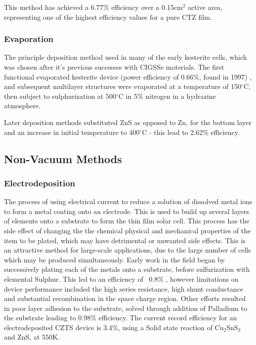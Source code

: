 This method has achieved a 6.77\% efficiency over a 0.15cm$^2$ active area, representing one of the highest efficiency values for a pure CTZ film. \citep{Mitzi2011}
\subsubsection{Evaporation}

The principle deposition method used in many of the early kesterite cells, which was chosen after it's previous successes with CIGSSe materials.
The first functional evaporated kesterite device (power efficiency of 0.66\%, found in 1997) , and subsequent multilayer structures were evaporated at a temperature of 150$^\circ$C, then subject to sulphurization at 500$^\circ$C in 5\% nitrogen in a hydrazine atmosphere.

Later deposition methods substituted ZnS as opposed to Zn, for the bottom layer and an increase in initial temperature to 400$^\circ$C - this lead to 2.62\% efficiency.\citep{Todorov2010}
\subsection{Non-Vacuum Methods}
\subsubsection{Electrodeposition}
The process of using electrical current to reduce a solution of dissolved metal ions to form a metal coating onto an electrode. This is used to build up several layers of elements onto a substrate to form the thin film solar cell. This process has the side effect of changing the the chemical physical and mechanical properties of the item to be plated, which may have detrimental or unwanted side effects. This is an attractive method for large-scale applications, due to the large number of cells which may be produced simultaneously. Early work in the field began by successively plating each of the metals onto a substrate, before sulfurization with elemental Sulphur. This led to an efficiency of ~0.8\% \citep{Scragg2008}, however limitations on device performance included the high series resistance, high shunt conductance and substantial recombination in the space charge region. Other efforts resulted in poor layer adhesion to the substrate, solved through addition of Palladium to the substrate leading to 0.98\% efficiency. The current record efficiency for an electrodeposited CZTS device is 3.4\%, using a Solid state reaction of Cu$_2$SnS$_3$ and ZnS, at 550K.

